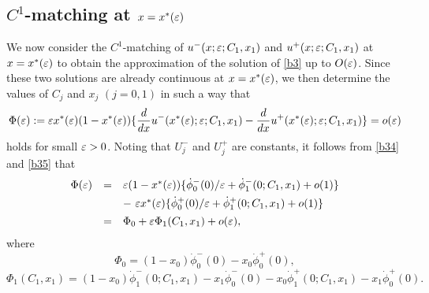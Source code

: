 \documentclass[a4,10pt]{article}
\begin{document}
\subsection{$C^1$-matching at $x = x^*(\varepsilon)$}\label{S2.2} %

We now consider the $C^1$-matching of $u^-(x ; \varepsilon;C_1,x_1)$ and $u^+(x ; \varepsilon;C_1,x_1)$ at $x = x^*(\varepsilon)$ to obtain the approximation of the solution of \eqref{b3} up to $O(\varepsilon)$. Since these two solutions are already continuous at $x = x^*(\varepsilon)$, we then determine the values of $C_j$ and $x_j$ $(j=0, 1)$ in such a way that
%
\[
\Phi(\varepsilon) := \varepsilon x^*(\varepsilon) ( 1 - x^*(\varepsilon)) \{
\frac{d}{dx}u^-(x^*(\varepsilon) ; \varepsilon;C_1,x_1) - \frac{d}{dx}u^+(x^*(\varepsilon) ; \varepsilon;C_1,x_1) \} = o(\varepsilon) 
\]
%
holds for small $\varepsilon >0$. Noting that $U^-_j$ and $U^+_j$ are constants,  
it follows from \eqref{b34} and \eqref{b35} that
%
\[
\begin{array}{lcl}
\Phi(\varepsilon) & = & \varepsilon  ( 1 - x^*(\varepsilon)) \{
\dot{\phi}^-_0(0)/\varepsilon + \dot{\phi}^-_1(0;C_1,x_1) + o(1) \} \\[1ex]  
 & & - \ \varepsilon  x^*(\varepsilon) \{
\dot{\phi}^+_0(0)/\varepsilon + \dot{\phi}^+_1(0;C_1,x_1)  + o(1) \} \\[1ex] 
& = & \Phi_0 + \varepsilon \Phi_1(C_1,x_1) + o(\varepsilon),
\end{array}
\]
%
where
%
\begin{equation}\label{b35zz}
\Phi_0 = (1-x_0) \dot{\phi}^-_0(0) - x_0  \dot{\phi}^+_0(0), 
\end{equation}
%
$$
\Phi_1(C_1,x_1) =  (1-x_0) \dot{\phi}^-_1(0;C_1,x_1) - x_1  \dot{\phi}^-_0(0) - x_0  \dot{\phi}^+_1(0;C_1,x_1)
- x_1  \dot{\phi}^+_0(0).
$$
%
\end{document}
